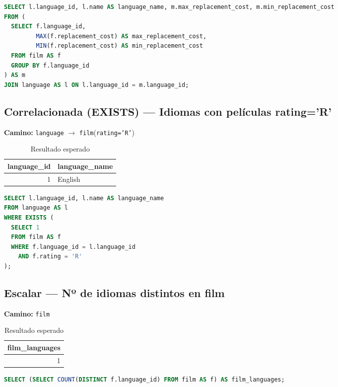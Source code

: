 \documentclass[12pt,a4paper]{article}
\begin{document}
\begin{lstlisting}[language=SQL]
SELECT l.language_id, l.name AS language_name, m.max_replacement_cost, m.min_replacement_cost
FROM (
  SELECT f.language_id,
         MAX(f.replacement_cost) AS max_replacement_cost,
         MIN(f.replacement_cost) AS min_replacement_cost
  FROM film AS f
  GROUP BY f.language_id
) AS m
JOIN language AS l ON l.language_id = m.language_id;
\end{lstlisting}

\subsection{Correlacionada (EXISTS) — Idiomas con películas rating='R'}
\textbf{Camino:} \texttt{language} $\rightarrow$ \texttt{film}(\texttt{rating='R'})

\begin{table}[h]
\centering
\caption{Resultado esperado}
\begin{tabular}{@{}r l@{}}
\toprule
\textbf{language\_id} & \textbf{language\_name} \\
\midrule
1 & English \\
\bottomrule
\end{tabular}
\end{table}

\begin{lstlisting}[language=SQL]
SELECT l.language_id, l.name AS language_name
FROM language AS l
WHERE EXISTS (
  SELECT 1
  FROM film AS f
  WHERE f.language_id = l.language_id
    AND f.rating = 'R'
);
\end{lstlisting}

\subsection{Escalar — Nº de idiomas distintos en film}
\textbf{Camino:} \texttt{film}

\begin{table}[h]
\centering
\caption{Resultado esperado}
\begin{tabular}{@{}r@{}}
\toprule
\textbf{film\_languages} \\
\midrule
1 \\
\bottomrule
\end{tabular}
\end{table}

\begin{lstlisting}[language=SQL]
SELECT (SELECT COUNT(DISTINCT f.language_id) FROM film AS f) AS film_languages;
\end{lstlisting}
\end{document}
